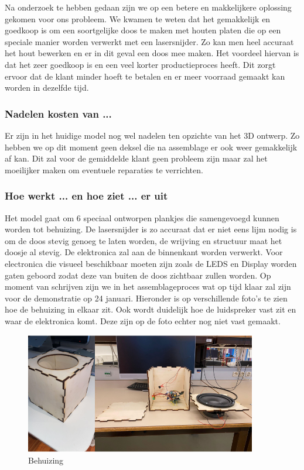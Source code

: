 Na onderzoek te hebben gedaan zijn we op een betere en makkelijkere oplossing gekomen voor ons probleem. We kwamen te weten dat het gemakkelijk en goedkoop is om een soortgelijke doos te maken met houten platen die op een speciale manier worden verwerkt met een lasersnijder. Zo kan men heel accuraat het hout bewerken en er in dit geval een doos mee maken. Het voordeel hiervan is dat het zeer goedkoop is en een veel korter productieproces heeft. Dit zorgt ervoor dat de klant minder hoeft te betalen en er meer voorraad gemaakt kan worden in dezelfde tijd.

\subsubsection{Nadelen kosten van ...}
Er zijn in het huidige model nog wel nadelen ten opzichte van het 3D ontwerp. Zo hebben we op dit moment geen deksel die na assemblage er ook weer gemakkelijk af kan. Dit zal voor de gemiddelde klant geen probleem zijn maar zal het moeilijker maken om eventuele reparaties te verrichten. 

\subsubsection{Hoe werkt ... en hoe ziet ... er uit}
Het model gaat om 6 speciaal ontworpen plankjes die samengevoegd kunnen worden tot behuizing. De lasersnijder is zo accuraat dat er niet eens lijm nodig is om de doos stevig genoeg te laten worden, de wrijving en structuur maat het doosje al stevig. De elektronica zal aan de binnenkant worden verwerkt. Voor electronica die visueel beschikbaar moeten zijn zoals de LEDS en Display worden gaten geboord zodat deze van buiten de doos zichtbaar zullen worden. Op moment van schrijven zijn we in het assemblageproces wat op tijd klaar zal zijn voor de demonstratie op 24 januari. Hieronder is op verschillende foto’s te zien hoe de behuizing in elkaar zit. Ook wordt duidelijk hoe de luidspreker vast zit en waar de elektronica komt. Deze zijn op de foto echter nog niet vast gemaakt.

\begin{figure}[ht]
    \centering
    \includegraphics[width=0.90\textwidth]{IMG/004/v5.PNG}
    \caption{Behuizing}
    \label{fig:Behuizing}
\end{figure}